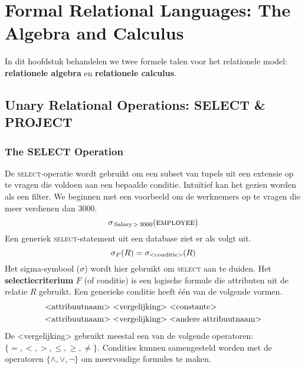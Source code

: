 \chapter{Formal Relational Languages: The Algebra and Calculus}
In dit hoofdstuk behandelen we twee formele talen voor het relationele model: \textbf{relationele algebra} en \textbf{relationele calculus}.

\section{Unary Relational Operations: SELECT \& PROJECT}
\subsection{The SELECT Operation}
De \textsc{select}-operatie wordt gebruikt om een subset van tupels uit een extensie op te vragen die voldoen aan een bepaalde conditie. Intu\"itief kan het gezien worden als een filter. We beginnen met een voorbeeld om de werknemers op te vragen die meer verdienen dan 3000.
\vspace{-2mm}
\[ \sigma_{\,\text{Salary}\,>\,3000}(\textsc{employee}) \]
Een generiek \textsc{select}-statement uit een database ziet er als volgt uit.
\vspace{-2mm}
\[ \sigma_F(R) = \sigma_\text{{\textless}conditie{\textgreater}}(R) \]
Het sigma-symbool ($\sigma$) wordt hier gebruikt om \textsc{select} aan te duiden. Het \textbf{selectiecriterium} $F$ (of conditie) is een logische formule die attributen uit de relatie $R$ gebruikt. Een generieke conditie heeft \'e\'en van de volgende vormen.
\vspace{-2mm}
\begin{align*}
&\text{{\textless}attribuutnaam{\textgreater} {\textless}vergelijking{\textgreater} {\textless}constante{\textgreater}} \\
&\text{{\textless}attribuutnaam{\textgreater} {\textless}vergelijking{\textgreater} {\textless}andere attribuutnaam{\textgreater}}
\end{align*}
De {\textless}vergelijking{\textgreater} gebruikt meestal een van de volgende operatoren: $\{=, <, >, \leqslant, \geqslant, \neq \}$. Condities kunnen samengesteld worden met de operatoren $\{\wedge, \vee, \neg\}$ om meervoudige formules te maken.

~

